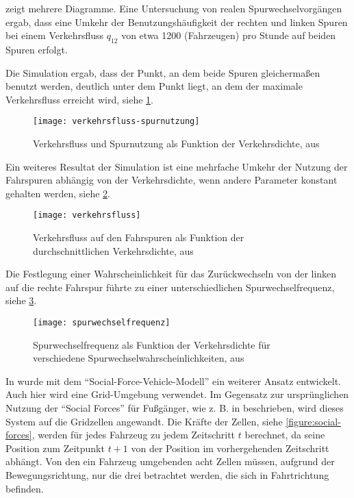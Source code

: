\cite{multi-lane} zeigt mehrere Diagramme. Eine Untersuchung von realen Spurwechselvorgängen ergab, dass eine Umkehr der Benutzungshäufigkeit der rechten und linken Spuren bei einem Verkehrsfluss $q_{12}$ von etwa 1200 (Fahrzeugen) pro Stunde auf beiden Spuren erfolgt.

Die Simulation ergab, dass der Punkt, an dem beide Spuren gleichermaßen benutzt werden, deutlich unter dem Punkt liegt, an dem der maximale Verkehrsfluss erreicht wird, siehe \cref{figure:verkehrsfluss-spurnutzung}.

\begin{figure}[hptb]
 \centering
 \texttt{[image: verkehrsfluss-spurnutzung]}
 \caption[Verkehrsfluss und Spurnutzung als Funktion der Verkehrsdichte]{Verkehrsfluss und Spurnutzung als Funktion der Verkehrsdichte, aus \cite{multi-lane}}
 \label{figure:verkehrsfluss-spurnutzung}
\end{figure}

Ein weiteres Resultat der Simulation ist eine mehrfache Umkehr der Nutzung der Fahrspuren abhängig von der Verkehrsdichte, wenn andere Parameter konstant gehalten werden, siehe \cref{figure:verkehrsfluss}.

\begin{figure}[hptb]
 \centering
 \texttt{[image: verkehrsfluss]}
 \caption[Verkehrsfluss als Funktion der durchschnittlichen Verkehrsdichte]{Verkehrsfluss auf den Fahrspuren als Funktion der durchschnittlichen Verkehrsdichte, aus \cite{multi-lane}}
 \label{figure:verkehrsfluss}
\end{figure}

Die Festlegung einer Wahrscheinlichkeit für das Zurückwechseln von der linken auf die rechte Fahrspur führte zu einer unterschiedlichen Spurwechselfrequenz, siehe \cref{figure:spurwechselfrequenz}.

\begin{figure}[hptb]
 \centering
 \texttt{[image: spurwechselfrequenz]}
 \caption[Spurwechselfrequenz als Funktion der Verkehrsdichte]{Spurwechselfrequenz als Funktion der Verkehrsdichte für verschiedene Spurwechselwahrscheinlichkeiten, aus \cite{multi-lane}}
 \label{figure:spurwechselfrequenz}
\end{figure}

In \cite{dat-ba} wurde mit dem \enquote{Social-Force-Vehicle-Modell} ein weiterer Ansatz entwickelt.
Auch hier wird eine Grid-Umgebung verwendet.
Im Gegensatz zur ursprünglichen Nutzung der \enquote{Social Forces} für Fußgänger, wie z. B. in \cite{soc-for} beschrieben, wird dieses System auf die Gridzellen angewandt. Die Kräfte der Zellen, siehe \cref{figure:social-forces}, werden für jedes Fahrzeug zu jedem Zeitschritt $t$ berechnet, da seine Position zum Zeitpunkt $t + 1$ von der Position im vorhergehenden Zeitschritt abhängt.
Von den ein Fahrzeug umgebenden acht Zellen müssen, aufgrund der Bewegungsrichtung, nur die drei betrachtet werden, die sich in Fahrtrichtung befinden.

